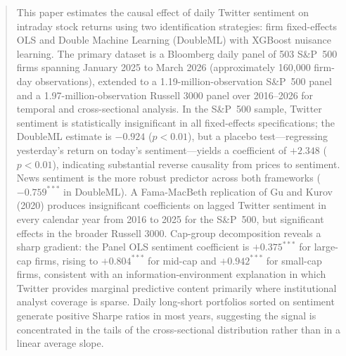 \begin{abstract}
This paper estimates the causal effect of daily Twitter sentiment on intraday stock returns
using two identification strategies: firm fixed-effects OLS and Double Machine Learning (DoubleML)
with XGBoost nuisance learning. The primary dataset is a Bloomberg daily panel of 503 S\&P~500
firms spanning January 2025 to March 2026 (approximately 160{,}000 firm-day observations),
extended to a 1.19-million-observation S\&P~500 panel and a 1.97-million-observation Russell 3000 panel
over 2016--2026 for temporal and cross-sectional analysis. In the S\&P~500 sample, Twitter sentiment
is statistically insignificant in all fixed-effects specifications; the DoubleML estimate is
$-0.924$ ($p < 0.01$), but a placebo test---regressing yesterday's return on today's
sentiment---yields a coefficient of $+2.348$ ($p < 0.01$), indicating substantial reverse
causality from prices to sentiment. News sentiment is the more robust predictor across both
frameworks ($-0.759^{***}$ in DoubleML). A Fama-MacBeth replication of Gu and Kurov (2020)
produces insignificant coefficients on lagged Twitter sentiment in every calendar year from
2016 to 2025 for the S\&P~500, but significant effects in the broader Russell 3000.
Cap-group decomposition reveals a sharp gradient: the Panel OLS sentiment coefficient is
$+0.375^{***}$ for large-cap firms, rising to $+0.804^{***}$ for mid-cap and
$+0.942^{***}$ for small-cap firms, consistent with an information-environment explanation
in which Twitter provides marginal predictive content primarily where institutional analyst
coverage is sparse. Daily long-short portfolios sorted on sentiment generate positive Sharpe
ratios in most years, suggesting the signal is concentrated in the tails of the
cross-sectional distribution rather than in a linear average slope.
\end{abstract}
